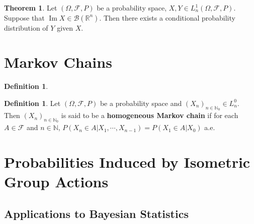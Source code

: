 \documentclass[12pt]{amsart}
\theoremstyle{definition}
\newtheorem{defn}[definition]{Definition}
\newtheorem{thm}[definition]{Theorem}
\newcommand{\Om}{\Omega}
\newcommand{\N}{\mathbb{N}}
\newcommand{\R}{\mathbb{R}}
\newcommand{\MB}{\mathcal{B}}
\newcommand{\MF}{\mathcal{F}}
\DeclareMathOperator{\Img}{Im}
\begin{document}
	\begin{thm}
	Let $(\Om, \MF, P)$ be a probability space, $X,Y \in L_n^1(\Om, \MF, P)$. Suppose that $\Img X \in \MB(\R^n)$. Then there exists a conditional probability distribution of $Y$ given $X$. 
	\end{thm}
	
	
	
	
	
	
	
	
	
	
	
	
	
	
	\newpage
	\section{Markov Chains}	

	\begin{defn}
	\end{defn}
	
	\begin{defn}
	Let $(\Om, \MF, P)$ be a probability space and $(X_n)_{n \in \N_0} \in L_n^0$. Then $(X_n)_{n \in \N_0}$ is said to be a \textbf{homogeneous Markov chain} if for each $A \in \MF$ and $n \in \N$, $P(X_n \in A| X_1, \cdots, X_{n-1}) = P(X_1 \in A| X_{0})$ a.e. 
	\end{defn}
	
	
	
	
	
	
	
	
	
	
	
	
	
	
	
	
	
	
	
	
	
	
	
	\newpage
	\section{Probabilities Induced by Isometric Group Actions}
	
	\subsection{Applications to Bayesian Statistics}
	
\end{document}

